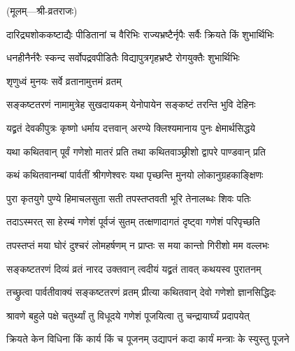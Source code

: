 \centerline{\small{(मूलम्—श्री-व्रतराजः)}}


\twolineshloka
{दारिद्र्यशोककष्टाद्यैः पीडितानां च वैरिभिः}
{राज्यभ्रष्टैर्नृपैः सर्वैः क्रियते किं शुभार्थिभिः} %


\twolineshloka
{धनहीनैर्नरैः स्कन्द सर्वोपद्रवपीडितैः}
{विद्यापुत्रगृहभ्रष्टै रोगयुक्तैः शुभार्थिभिः} %


\onelineshloka
{शृणुध्वं मुनयः सर्वे व्रतानामुत्तमं व्रतम्} %


\twolineshloka
{सङ्कष्टतरणं नामामुत्रेह सुखदायकम्}
{येनोपायेन सङ्कष्टं तरन्ति भुवि देहिनः} %


\twolineshloka
{यद्व्रतं देवकीपुत्रः कृष्णो धर्माय दत्तवान्}
{अरण्ये क्लिश्यमानाय पुनः क्षेमार्थसिद्धये} %


\twolineshloka
{यथा कथितवान् पूर्वं गणेशो मातरं प्रति}
{तथा कथितवाञ्छ्रीशो द्वापरे पाण्डवान् प्रति} %


\twolineshloka
{कथं कथितवानम्बां पार्वतीं श्रीगणेश्वरः}
{यथा पृच्छन्ति मुनयो लोकानुग्रहकाङ्क्षिणः} %


\twolineshloka
{पुरा कृतयुगे पुण्ये हिमाचलसुता सती}
{तपस्तप्तवती भूरि तेनालब्धः शिवः पतिः\footnotemark} %


\twolineshloka
{तदाऽस्मरत् सा हेरम्बं गणेशं पूर्वजं सुतम्}
{तत्क्षणादागतं दृष्ट्वा गणेशं परिपृच्छति} %


\twolineshloka
{तपस्तप्तं मया घोरं दुश्चरं लोमहर्षणम्}
{न प्राप्तः स मया कान्तो गिरीशो मम वल्लभः} %


\twolineshloka
{सङ्कष्टतरणं दिव्यं व्रतं नारद उक्तवान्}
{त्वदीयं यद्व्रतं तावत् कथयस्व पुरातनम्} %


\twolineshloka
{तच्छ्रुत्वा पार्वतीवाक्यं सङ्कष्टतरणं व्रतम्}
{प्रीत्या कथितवान् देवो गणेशो ज्ञानसिद्धिदः} %


\twolineshloka
{श्रावणे बहुले पक्षे चतुर्थ्यां तु विधूदये}
{गणेशं पूजयित्वा तु चन्द्रायार्घ्यं प्रदापयेत्} %


\twolineshloka
{क्रियते केन विधिना किं कार्य किं च पूजनम्}
{उद्यापनं कदा कार्यं मन्त्राः के स्युस्तु पूजने} %

